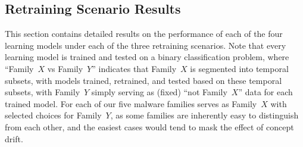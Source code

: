 \documentclass[12pt]{article}
\begin{document}
\begin{table}[!htb]
\centering
\caption{Hyperparameters for clustering and classification models}
\label{tab:parameters}
\end{table}

\subsection{Retraining Scenario Results}

This section contains detailed results on the performance of each of the four learning models 
under each of the three retraining scenarios. Note that every learning model is trained and tested
on a binary classification
problem, where ``Family~$X$ vs Family~$Y$'' indicates that Family~$X$ is segmented
into temporal subsets, with models trained, retrained, and tested 
based on these temporal subsets, with
Family~$Y$ simply serving as (fixed) ``not Family~$X$'' data for each trained model.
For each of our five malware families serves as Family~$X$ 
with selected choices for Family~$Y$, 
as some families are inherently easy to distinguish from each other, 
and the easiest cases would tend to mask the effect of concept drift.
\end{document}
